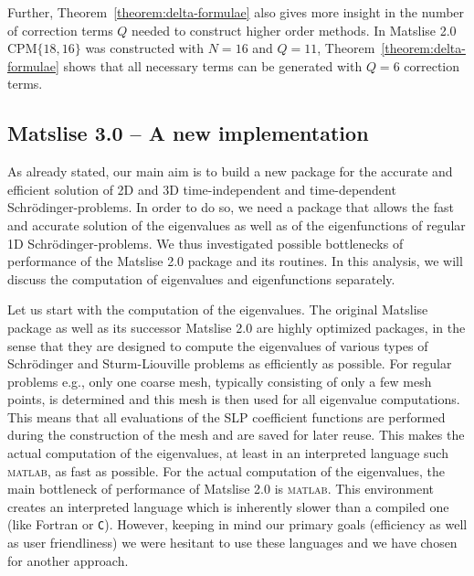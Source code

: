 Further, Theorem~\ref{theorem:delta-formulae} also gives more insight in the number of correction terms $Q$ needed to construct higher order methods. In Matslise 2.0 $\text{CPM}\{18, 16\}$ was constructed with $N=16$ and $Q=11$, Theorem~\ref{theorem:delta-formulae} shows that all necessary terms can be generated with $Q=6$ correction terms.



\subsection{Matslise 3.0 -- A new implementation}\label{a-new-implementation}

As already stated, our main aim is to build a new package for the accurate and efficient solution of 2D and 3D time-independent and time-dependent Schrödinger-problems.
In order to do so, we need a package that allows the fast and accurate solution of the eigenvalues as well as of the eigenfunctions of regular 1D Schrödinger-problems.
We thus investigated possible bottlenecks of performance of the Matslise 2.0 package and its routines. In this analysis, we will discuss the computation of eigenvalues and eigenfunctions separately.


Let us start with the computation of the eigenvalues.
The original Matslise package as well as its successor Matslise 2.0 are highly optimized packages, in the sense that they are designed to compute the eigenvalues of various types of Schrödinger and
Sturm-Liouville problems as efficiently as possible. For regular problems e.g., only one coarse mesh, typically consisting of only a few mesh points, is determined and this mesh is then used for all eigenvalue computations. This means that all evaluations of the SLP coefficient functions are performed during the construction of the mesh and are saved for later reuse. This makes the actual computation of the eigenvalues, at least in an interpreted language such \textsc{matlab}, as fast as possible. For the actual computation of the eigenvalues, the main bottleneck of performance of Matslise 2.0 is \textsc{matlab}. This environment creates an interpreted language which is inherently slower than a compiled one (like Fortran or
\texttt{C}). However, keeping in mind our primary goals (efficiency as well as user friendliness) we were hesitant to use these languages and we have chosen for another approach.

